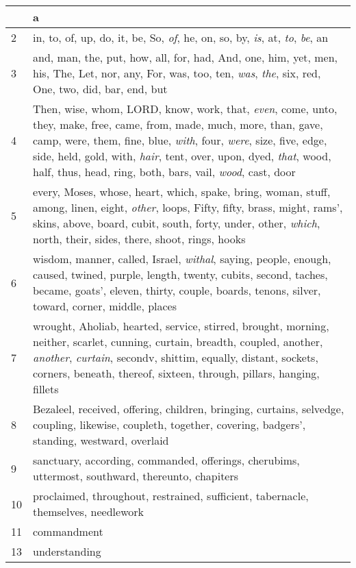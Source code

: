 \begin{longtable}{l|p{3.75in}}
\hline \hline
\endlastfoot
1 & a \\ \hline
2 & in, to, of, up, do, it, be, So, \emph{of}, he, on, so, by, \emph{is}, at, \emph{to}, \emph{be}, an \\ \hline
3 & and, man, the, put, how, all, for, had, And, one, him, yet, men, his, The, Let, nor, any, For, was, too, ten, \emph{was}, \emph{the}, six, red, One, two, did, bar, end, but \\ \hline
4 & Then, wise, whom, LORD, know, work, that, \emph{even}, come, unto, they, make, free, came, from, made, much, more, than, gave, camp, were, them, fine, blue, \emph{with}, four, \emph{were}, size, five, edge, side, held, gold, with, \emph{hair}, tent, over, upon, dyed, \emph{that}, wood, half, thus, head, ring, both, bars, vail, \emph{wood}, cast, door \\ \hline
5 & every, Moses, whose, heart, which, spake, bring, woman, stuff, among, linen, eight, \emph{other}, loops, Fifty, fifty, brass, might, rams', skins, above, board, cubit, south, forty, under, other, \emph{which}, north, their, sides, there, shoot, rings, hooks \\ \hline
6 & wisdom, manner, called, Israel, \emph{withal}, saying, people, enough, caused, twined, purple, length, twenty, cubits, second, taches, became, goats', eleven, thirty, couple, boards, tenons, silver, toward, corner, middle, places \\ \hline
7 & wrought, Aholiab, hearted, service, stirred, brought, morning, neither, scarlet, cunning, curtain, breadth, coupled, another, \emph{another}, \emph{curtain}, secondv, shittim, equally, distant, sockets, corners, beneath, thereof, sixteen, through, pillars, hanging, fillets \\ \hline
8 & Bezaleel, received, offering, children, bringing, curtains, selvedge, coupling, likewise, coupleth, together, covering, badgers', standing, westward, overlaid \\ \hline
9 & sanctuary, according, commanded, offerings, cherubims, uttermost, southward, thereunto, chapiters \\ \hline
10 & proclaimed, throughout, restrained, sufficient, tabernacle, themselves, needlework \\ \hline
11 & commandment \\ \hline
13 & understanding \\ \hline
\end{longtable}






